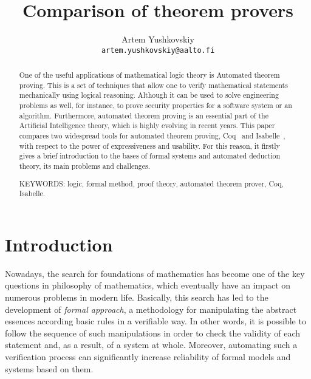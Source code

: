 \documentclass[article]{aaltoseries}
\begin{document}

\title{Comparison of theorem provers}

\author{Artem Yushkovskiy
\\\textnormal{\texttt{artem.yushkovskiy@aalto.fi}}}


\maketitle


\begin{abstract}
One of the useful applications of mathematical logic theory is Automated theorem proving. This is a set of techniques that allow one to verify mathematical statements mechanically using logical reasoning. Although it can be used to solve engineering problems as well, for instance, to prove security properties for a software system or an algorithm.
Furthermore, automated theorem proving is an essential part of the Artificial Intelligence theory, which is highly evolving in recent years.
This paper compares two widespread tools for automated theorem proving, Coq~\cite{tool_Coq} and Isabelle~\cite{tool_Isabelle}, with respect to the power of expressiveness and usability. For this reason, it firstly gives a brief introduction to the bases of formal systems and automated deduction theory, its main problems and challenges.

\vspace{3mm}
\noindent KEYWORDS: logic, formal method, proof theory, automated theorem prover, Coq, Isabelle.
	
\end{abstract}



\section{Introduction}

Nowadays, the search for foundations of mathematics has become one of the key questions in philosophy of mathematics, which eventually have an impact on numerous problems in modern life. Basically, this search has led to the development of \textit{formal approach}, a methodology for manipulating the abstract essences according basic rules in a verifiable way. In other words, it is possible to follow the sequence of such manipulations in order to check the validity of each statement and, as a result, of a system at whole. Moreover, automating such a verification process can significantly increase reliability of formal models and systems based on them.
\end{document}
